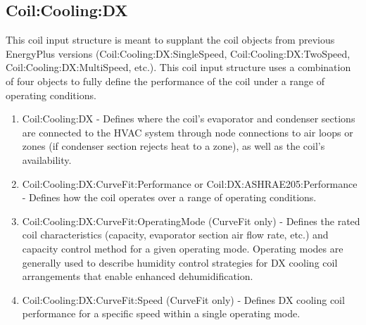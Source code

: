 \subsection{Coil:Cooling:DX}\label{coilcoolingdx}

This coil input structure is meant to supplant the coil objects from previous EnergyPlus versions (Coil:Cooling:DX:SingleSpeed, Coil:Cooling:DX:TwoSpeed, Coil:Cooling:DX:MultiSpeed, etc.). This coil input structure uses a combination of four objects to fully define the performance of the coil under a range of operating conditions.

\begin{enumerate}
\def\labelenumi{\arabic{enumi}.}
\item Coil:Cooling:DX - Defines where the coil's evaporator and condenser sections are connected to the HVAC system through node connections to air loops or zones (if condenser section rejects heat to a zone), as well as the coil's availability.

\item Coil:Cooling:DX:CurveFit:Performance or Coil:DX:ASHRAE205:Performance - Defines how the coil operates over a range of operating conditions.

\item Coil:Cooling:DX:CurveFit:OperatingMode (CurveFit only) - Defines the rated coil characteristics (capacity, evaporator section air flow rate, etc.) and capacity control method for a given operating mode. Operating modes are generally used to describe humidity control strategies for DX cooling coil arrangements that enable enhanced dehumidification.

\item Coil:Cooling:DX:CurveFit:Speed  (CurveFit only) - Defines DX cooling coil performance for a specific speed within a single operating mode.
\end{enumerate}
